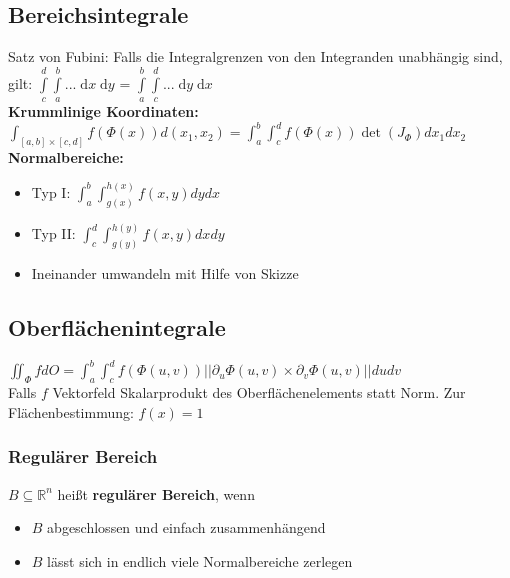 \documentclass[6pt,a4paper]{scrartcl}
\renewcommand{\emph}[1]{\textbf{#1}}                                                            %
\newcommand{\diff}{\ensuremath{\;\mathrm d}}                                   %
\newcommand{\R}{\ensuremath{\mathbb R}}
\begin{document}
\begin{multicols*}{4}


    \section{Bereichsintegrale}
    Satz von Fubini: Falls die Integralgrenzen von den Integranden unabhängig sind, gilt: $\int\limits^d_c \int\limits^b_a ... \diff x \diff y$ = $\int\limits^b_a \int\limits^d_c ... \diff y \diff x$\\
    \textbf{Krummlinige Koordinaten:}\\ $\int_{[a,b] \times [c,d]}f(\Phi(x))d(x_1,x_2) = \int_a^b \int_c^d f(\Phi(x)) \det(J_\Phi) dx_1dx_2$
    \textbf{Normalbereiche:}
    \begin{itemize}
        \item Typ I: $\int_a^b \int_{g(x)}^{h(x)} f(x,y)dydx$
        \item Typ II: $\int_c^d \int_{g(y)}^{h(y)} f(x,y)dxdy$
        \item Ineinander umwandeln mit Hilfe von Skizze
    \end{itemize}

    \subsection{Oberflächenintegrale}
    $\iint_\Phi f dO = \int_a^b\int_c^d f(\Phi(u,v)) ||\partial_u \Phi(u,v) \times \partial_v \Phi(u,v)||du dv$\\
    Falls $f$ Vektorfeld Skalarprodukt des Oberflächenelements statt Norm. Zur Flächenbestimmung: $f(x) = 1$

    \subsubsection{Regulärer Bereich}
    $B \subseteq \R^n$ heißt \emph{regulärer Bereich}, wenn
    \begin{itemize}
        \item $B$ abgeschlossen und einfach zusammenhängend
        \item $B$ lässt sich in endlich viele Normalbereiche zerlegen\\
    \end{itemize}


\end{multicols*}
\end{document}
